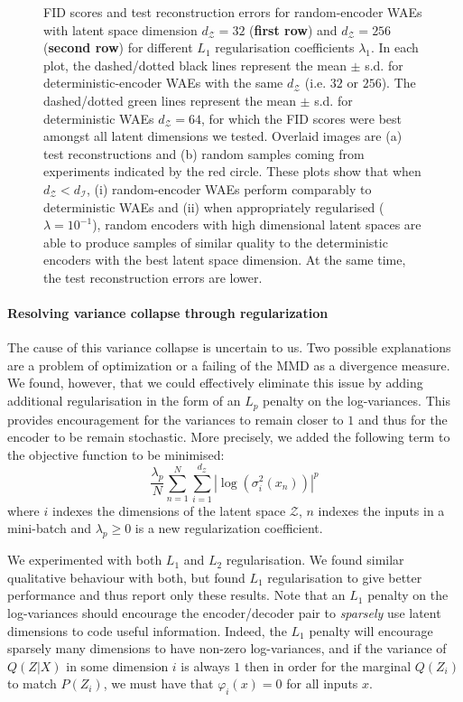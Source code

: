 \documentclass{article}
\def\dZ{d_{\mathcal{Z}}}
\def\dP{d_{\mathcal{I}}}
\def\Z{\mathcal{Z}}
\begin{document}
\begin{figure}[t!]
\begin{minipage}{.45\textwidth}
		
	\end{minipage}%
	\caption{\label{fid:celebA-fid-test-errors-vs-latent-dim}FID scores and test reconstruction errors for random-encoder WAEs with latent space dimension $\dZ=32$ (\textbf{first row}) and $\dZ=256$ (\textbf{second row}) for different $L_1$ regularisation coefficients $\lambda_1$. In each plot, the dashed/dotted black lines represent the mean $\pm$ s.d. for deterministic-encoder WAEs with the same $\dZ$ (i.e. $32$ or $256$). The dashed/dotted green lines represent the mean $\pm$ s.d. for deterministic WAEs $\dZ=64$, for which the FID scores were best amongst all latent dimensions we tested. Overlaid images are (a) test reconstructions and (b) random samples coming from experiments indicated by the red circle. These plots show that when $\dZ<\dP$, (i) random-encoder WAEs perform comparably to deterministic WAEs and (ii) when appropriately regularised ($\lambda=10^{-1}$), random encoders with high dimensional latent spaces are able to produce samples of similar quality to the deterministic encoders with the best latent space dimension. At the same time, the test reconstruction errors are lower.}
\end{figure}


\paragraph{Resolving variance collapse through regularization}
The cause of this variance collapse is uncertain to us. Two possible explanations are a problem of optimization or a failing of the MMD as a divergence measure. 
We found, however, that we could effectively eliminate this issue by adding additional regularisation in the form of an $L_p$ penalty on the log-variances. This provides encouragement for the variances to remain closer to $1$ and thus for the encoder to be remain stochastic. More precisely, we added the following term to the objective function to be minimised:
\begin{equation}
\frac{\lambda_{p}}{N}\sum_{n=1}^N \sum_{i=1}^{\dZ} \left|\log\left(\sigma^2_{i}(x_n)\right) \right|^p
\end{equation}
where $i$ indexes the dimensions of the latent space $\Z$, $n$ indexes the inputs in a mini-batch and $\lambda_{p}\geq 0$ is a new regularization coefficient.


We experimented with both $L_1$ and $L_2$ regularisation. We found similar qualitative behaviour with both, but found $L_1$ regularisation to give better performance and thus report only these results. Note that an $L_1$ penalty on the log-variances should encourage the encoder/decoder pair to \emph{sparsely} use latent dimensions to code useful information. Indeed, the $L_1$ penalty will encourage sparsely many dimensions to have non-zero log-variances, and if the variance of $Q(Z|X)$ in some dimension $i$ is always $1$ then in order for the marginal $Q(Z_i)$ to match $P(Z_i)$, we must have that $\varphi_i(x)=0$ for all inputs $x$. 
\end{document}
